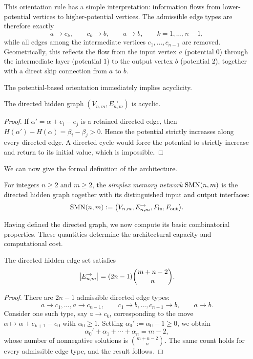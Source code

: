 This orientation rule has a simple interpretation: information flows from lower-potential vertices to higher-potential vertices. The admissible edge types are therefore exactly
\[
a\to c_k,\qquad c_k\to b,\qquad a\to b,
\qquad k=1,\dots,n-1,
\]
while all edges among the intermediate vertices $c_1,\dots,c_{n-1}$ are removed. Geometrically, this reflects the flow from the input vertex $a$ (potential 0) through the intermediate layer (potential 1) to the output vertex $b$ (potential 2), together with a direct skip connection from $a$ to $b$.

The potential-based orientation immediately implies acyclicity.

\begin{proposition}[Acyclicity]
The directed hidden graph $(V_{n,m},E^{\rightarrow}_{n,m})$ is acyclic.
\end{proposition}

\begin{proof}
If $\alpha' = \alpha + e_i-e_j$ is a retained directed edge, then $H(\alpha')-H(\alpha)=\beta_i-\beta_j > 0$. Hence the potential strictly increases along every directed edge. A directed cycle would force the potential to strictly increase and return to its initial value, which is impossible.
\end{proof}

We can now give the formal definition of the architecture.

\begin{definition}
For integers $n\geq 2$ and $m\geq 2$, the \emph{simplex memory network} $\mathrm{SMN}(n,m)$ is the directed hidden graph together with its distinguished input and output interfaces:
\[
\mathrm{SMN}(n,m)
:=
\bigl(V_{n,m}, E^{\rightarrow}_{n,m}, F_{\mathrm{in}}, F_{\mathrm{out}}\bigr).
\]
\end{definition}

Having defined the directed graph, we now compute its basic combinatorial properties. These quantities determine the architectural capacity and computational cost.

\begin{proposition}
The directed hidden edge set satisfies
\[
\left|E^{\rightarrow}_{n,m}\right| = (2n-1)\binom{m+n-2}{n}.
\]
\end{proposition}

\begin{proof}
There are $2n-1$ admissible directed edge types:
\[
a\to c_1,\dots,a\to c_{n-1},\qquad c_1\to b,\dots,c_{n-1}\to b,\qquad a\to b.
\]
Consider one such type, say $a\to c_k$, corresponding to the move $\alpha \mapsto \alpha + e_{k+1}-e_0$ with $\alpha_0\geq 1$. Setting $\alpha_0' := \alpha_0-1\geq 0$, we obtain
\[
\alpha_0' + \alpha_1 + \cdots + \alpha_n = m-2,
\]
whose number of nonnegative solutions is $\binom{m+n-2}{n}$. The same count holds for every admissible edge type, and the result follows.
\end{proof}

